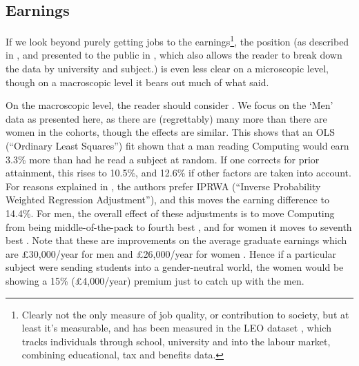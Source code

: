 \documentclass[sigconf]{acmart}
\begin{document}
\subsection{Earnings}
If we look beyond purely getting jobs to the earnings\footnote{Clearly not the only measure of job quality, or contribution to society, but at least it's measurable, and has been measured in the LEO dataset \cite{DfE2017a}, which tracks individuals through school, university and into the labour market, combining educational, tax and benefits data.}, the position (as described in \cite{DfE2018d}, and presented to the public in \cite{BBC2018f}, which also allows the reader to break down the data by university and subject.) is even less clear on a microscopic level, though on a macroscopic level it bears out much of what \cite{Shadbolt2016a} said.

On the macroscopic level, the reader should consider \cite[Table 5]{DfE2018d}. We focus on the `Men' data as presented here, as there are (regrettably) many more than there are women in the cohorts, though the effects are similar. This shows that an OLS (``Ordinary Least Squares'') fit shown that a man reading Computing would earn 3.3\% more than had he read a subject at random. If one corrects for prior attainment, this rises to 10.5\%, and 12.6\% if other factors are taken into account. For reasons explained in \cite[\S4.2]{DfE2018d}, the authors prefer IPRWA (``Inverse Probability Weighted Regression Adjustment''), and this moves the earning difference to 14.4\%. For men, the overall effect of these adjustments is to move Computing from being middle-of-the-pack \cite[Figure 15]{DfE2018d} to fourth best  \cite[Figure 17]{DfE2018d}, and for women it moves to seventh best  \cite[Figure 16]{DfE2018d}. Note that these are improvements on the average graduate earnings which are \pounds30,000/year for men and \pounds26,000/year for women \cite[p. 37]{DfE2018d}. Hence if a particular subject were sending students into a gender-neutral world, the women would be showing a 15\% (\pounds4,000/year) premium just to catch up with the men.
\end{document}
